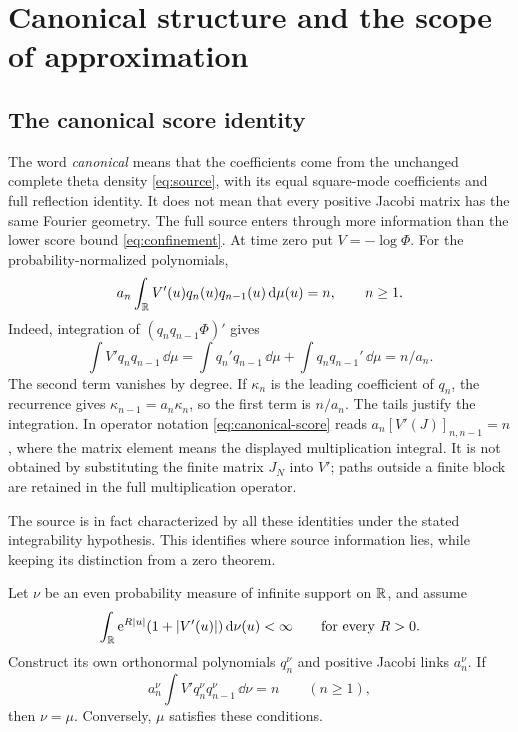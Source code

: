 \section{Canonical structure and the scope of approximation}
\label{sec:source-scope}

\subsection{The canonical score identity}

The word \emph{canonical} means that the coefficients come from the
unchanged complete theta density \eqref{eq:source}, with its equal
square-mode coefficients and full reflection identity. It does not
mean that every positive Jacobi matrix has the same Fourier geometry.
The full source enters through more information than the lower
score bound \eqref{eq:confinement}. At time zero put \(V=-\log\Phi\).
For the probability-normalized polynomials,
\begin{equation}
 a_n\int_\mathbb R V'(u)q_n(u)q_{n-1}(u)\,\mathrm d\mu(u)=n,\qquad n\ge1.
 \label{eq:canonical-score}
\end{equation}
Indeed, integration of \((q_nq_{n-1}\Phi)'\) gives
\[
 \int V'q_nq_{n-1}\,\dd\mu
  =\int q_n'q_{n-1}\,\dd\mu+\int q_nq_{n-1}'\,\dd\mu=n/a_n.
\]
The second term vanishes by degree. If \(\kappa_n\) is the leading
coefficient of \(q_n\), the recurrence gives
\(\kappa_{n-1}=a_n\kappa_n\), so the first term is \(n/a_n\).
The tails justify the integration. In operator notation
\eqref{eq:canonical-score} reads
\(a_n[V'(J)]_{n,n-1}=n\), where the matrix element means the
displayed multiplication integral. It is not obtained by substituting
the finite matrix \(J_N\) into \(V'\); paths outside a finite block
are retained in the full multiplication operator.

The source is in fact characterized by all these identities under
the stated integrability hypothesis. This identifies where source
information lies, while keeping its distinction from a zero theorem.

\begin{proposition}
\label{prop:score-rigidity}
Let \(\nu\) be an even probability measure of infinite support on
\(\mathbb R\), and assume
\[
 \int_\mathbb R \mathrm e^{R|u|}(1+|V'(u)|)\,\mathrm d\nu(u)<\infty
                      \qquad\hbox{for every }R>0.
\]
Construct its own orthonormal polynomials \(q_n^\nu\) and positive
Jacobi links \(a_n^\nu\). If
\begin{equation}
 a_n^\nu\int V'q_n^\nu q_{n-1}^\nu\,\dd\nu=n
                              \qquad(n\ge1),
 \label{eq:score-rigidity-hypothesis}
\end{equation}
then \(\nu=\mu\). Conversely, \(\mu\) satisfies these conditions.
\end{proposition}

